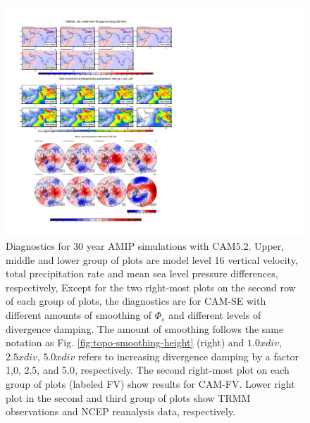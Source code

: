 \documentclass[gmd]{copernicus}
\begin{document}
\begin{figure}[t]
\vspace*{2mm}
\begin{center}
\includegraphics[width=12cm]{fig/topo-smoothing-experiments.pdf}
\end{center}
  \caption{Diagnostics for 30 year AMIP simulations with CAM5.2. Upper, middle and lower group of plots are  model level 16 vertical velocity, total precipitation rate and mean sea level pressure differences, respectively, Except for the two right-most plots on the second row of each group of plots, the diagnostics are for CAM-SE with different amounts of smoothing of $\Phi_s$ and different levels of divergence damping. The amount of smoothing follows the same notation as Fig. \ref{fig:topo-smoothing-height} (right) and $1.0 x div$, $2.5 x div$, $5.0 x div$ refers to increasing divergence damping by a factor 1,0, 2.5, and 5.0, respectively. The second right-most plot on each group of plots (labeled FV) show results for CAM-FV. Lower right plot in the second and third group of plots show TRMM observations and NCEP reanalysis data, respectively.}\label{fig:topo-smoothing-exp}
\end{figure}
\end{document}
